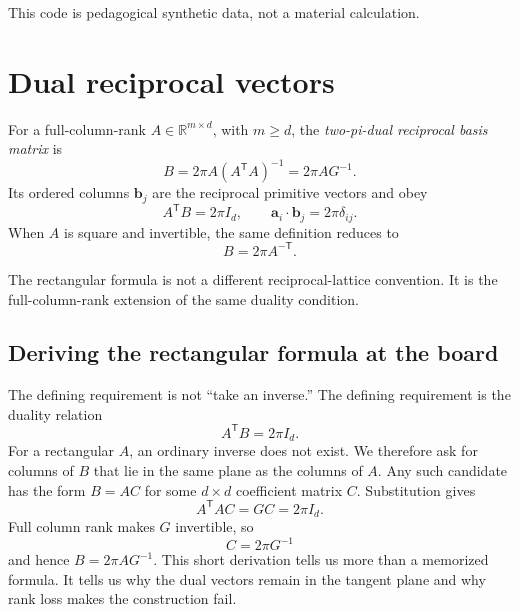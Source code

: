 This code is pedagogical synthetic data, not a material calculation.


\section{Dual reciprocal vectors}

\begin{definition}
\label{def:training-two-pi-dual-basis}
For a full-column-rank $A\in\mathbb R^{m\times d}$, with $m\geq d$, the
\emph{two-pi-dual reciprocal basis matrix} is
\begin{equation}
  B=2\pi A\left(A^{\mathsf T}A\right)^{-1}
   =2\pi A G^{-1}.
  \label{eq:training-rectangular-dual}
\end{equation}
Its ordered columns $\mathbf b_j$ are the reciprocal primitive vectors and obey
\begin{equation}
  A^{\mathsf T}B=2\pi I_d,
  \qquad
  \mathbf a_i\cdot\mathbf b_j=2\pi\delta_{ij}.
  \label{eq:training-dual-identity}
\end{equation}
When $A$ is square and invertible, the same definition reduces to
\begin{equation}
  B=2\pi A^{-\mathsf T}.
  \label{eq:training-square-dual}
\end{equation}
\end{definition}

The rectangular formula is not a different reciprocal-lattice convention. It
is the full-column-rank extension of the same duality condition.

\subsection{Deriving the rectangular formula at the board}

The defining requirement is not ``take an inverse.'' The defining requirement
is the duality relation
\begin{equation}
  A^{\mathsf T}B=2\pi I_d.
\end{equation}
For a rectangular $A$, an ordinary inverse does not exist. We therefore ask for
columns of $B$ that lie in the same plane as the columns of $A$. Any such
candidate has the form $B=AC$ for some $d\times d$ coefficient matrix $C$.
Substitution gives
\begin{equation}
  A^{\mathsf T}AC=GC=2\pi I_d.
\end{equation}
Full column rank makes $G$ invertible, so
\begin{equation}
  C=2\pi G^{-1}
\end{equation}
and hence $B=2\pi AG^{-1}$. This short derivation tells us more than a memorized
formula. It tells us why the dual vectors remain in the tangent plane and why
rank loss makes the construction fail.

